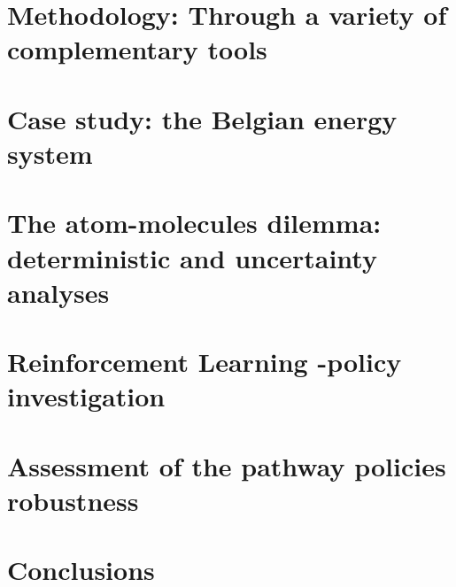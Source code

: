 \documentclass[a4paper,twoside,10pt,final]{memoir} %
\begin{document}
\chapter{Methodology: Through a variety of complementary tools}
\label{chap:chap_methodo}

\clearpage

%
\clearemptydoublepage
\chapter{Case study: the Belgian energy system} 
\label{chap:case_study}

\clearpage
%
%
%
\clearemptydoublepage
\chapter{The atom-molecules dilemma: deterministic and uncertainty analyses} 
\label{chap:atom_mol}

\clearpage


\clearemptydoublepage
\chapter{Reinforcement Learning -policy investigation}
\label{chap:chap_RL}

\clearpage

\clearemptydoublepage
\chapter{Assessment of the pathway policies robustness}
\label{chap:chap_RobPol}

\clearpage

%
\clearemptydoublepage
\chapter*[Conclusions]{Conclusions} 

\clearpage

\clearemptydoublepage

\end{document}
